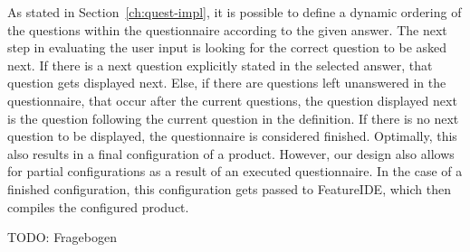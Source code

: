 As stated in Section~\ref{ch:quest-impl}, it is possible to define a dynamic ordering of the questions within the questionnaire according to the given answer. The next step in evaluating the user input is looking for the correct question to be asked next. If there is a next question explicitly stated in the selected answer, that question gets displayed next. Else, if there are questions left unanswered in the questionnaire, that occur after the current questions, the question displayed next is the question following the current question in the definition. If there is no next question to be displayed, the questionnaire is considered finished. Optimally, this also results in a final configuration of a product. However, our design also allows for partial configurations as a result of an executed questionnaire. In the case of a finished configuration, this configuration gets passed to FeatureIDE, which then compiles the configured product.



{\color{red}TODO: Fragebogen}






%


